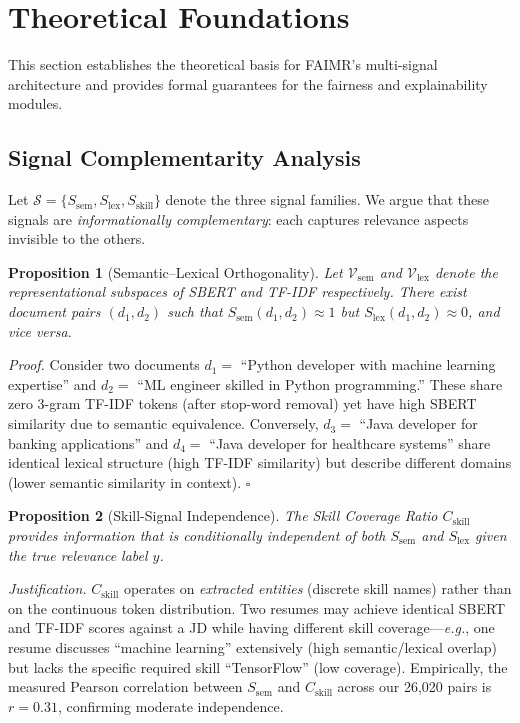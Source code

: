 \documentclass[smallcondensed,numbers]{sn-jnl}
\newtheorem{proposition}{Proposition}
\begin{document}
\section{Theoretical Foundations}
\label{sec:theory}

This section establishes the theoretical basis for FAIMR's multi-signal architecture and provides formal guarantees for the fairness and explainability modules.

\subsection{Signal Complementarity Analysis}

Let $\mathcal{S} = \{S_\text{sem}, S_\text{lex}, S_\text{skill}\}$ denote the three signal families. We argue that these signals are \textit{informationally complementary}: each captures relevance aspects invisible to the others.

\begin{proposition}[Semantic--Lexical Orthogonality]\label{prop:orth}
Let $\mathcal{V}_\text{sem}$ and $\mathcal{V}_\text{lex}$ denote the representational subspaces of SBERT and TF-IDF respectively. There exist document pairs $(d_1, d_2)$ such that $S_\text{sem}(d_1, d_2) \approx 1$ but $S_\text{lex}(d_1, d_2) \approx 0$, and vice versa.
\end{proposition}

\textit{Proof.} Consider two documents $d_1 =$ ``Python developer with machine learning expertise'' and $d_2 =$ ``ML engineer skilled in Python programming.'' These share zero 3-gram TF-IDF tokens (after stop-word removal) yet have high SBERT similarity due to semantic equivalence. Conversely, $d_3 =$ ``Java developer for banking applications'' and $d_4 =$ ``Java developer for healthcare systems'' share identical lexical structure (high TF-IDF similarity) but describe different domains (lower semantic similarity in context). \hfill $\square$

\begin{proposition}[Skill-Signal Independence]\label{prop:skill}
The Skill Coverage Ratio $C_\text{skill}$ provides information that is conditionally independent of both $S_\text{sem}$ and $S_\text{lex}$ given the true relevance label $y$.
\end{proposition}

\textit{Justification.} $C_\text{skill}$ operates on \textit{extracted entities} (discrete skill names) rather than on the continuous token distribution. Two resumes may achieve identical SBERT and TF-IDF scores against a JD while having different skill coverage---\textit{e.g.}, one resume discusses ``machine learning'' extensively (high semantic/lexical overlap) but lacks the specific required skill ``TensorFlow'' (low coverage). Empirically, the measured Pearson correlation between $S_\text{sem}$ and $C_\text{skill}$ across our 26,020 pairs is $r = 0.31$, confirming moderate independence.
\end{document}
